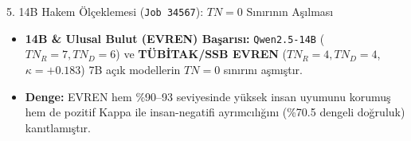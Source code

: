 \documentclass[aspectratio=169,10pt]{beamer}
\begin{document}
\begin{frame}{5. 14B Hakem Ölçeklemesi (\texttt{Job 34567}): $TN = 0$ Sınırının Aşılması}
\begin{itemize}
    \item \textbf{14B \& Ulusal Bulut (EVREN) Başarısı:} \texttt{Qwen2.5-14B} ($TN_R=7, TN_D=6$) ve \textbf{TÜBİTAK/SSB EVREN} ($TN_R=4, TN_D=4$, $\kappa=+0.183$) 7B açık modellerin $TN=0$ sınırını aşmıştır.
    \item \textbf{Denge:} EVREN hem \%90--93 seviyesinde yüksek insan uyumunu korumuş hem de pozitif Kappa ile insan-negatifi ayrımcılığını (\%70.5 dengeli doğruluk) kanıtlamıştır.
\end{itemize}
\end{frame}

\end{document}
